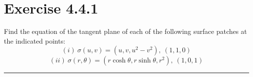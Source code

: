 \documentclass[12pt]{article}
\begin{document}
\maketitle

\section*{Exercise 4.4.1}
\indent

Find the equation of the tangent plane of each of the following surface patches at the indicated points:\\

$$
(i) \ \sigma(u,v) = (u,v,u^2-v^2), \ (1,1,0)
$$
$$
(ii) \ \sigma(r,\theta) = (r \cosh \theta, r \sinh \theta,r^2), \ (1,0,1)
$$

\vspace{1cm}
\hrule
\vspace{1cm}
\noindent
\end{document}
